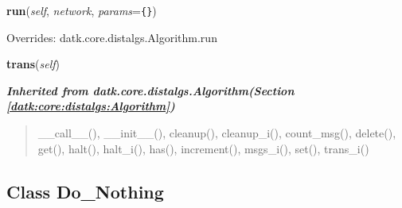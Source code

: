     \vspace{0.5ex}

\hspace{.8\funcindent}\begin{boxedminipage}{\funcwidth}

    \raggedright \textbf{run}(\textit{self}, \textit{network}, \textit{params}={\tt \texttt{\{}\texttt{\}}})

\setlength{\parskip}{2ex}
\setlength{\parskip}{1ex}
      Overrides: datk.core.distalgs.Algorithm.run

    \end{boxedminipage}

    \label{datk:core:distalgs:Synchronous_Algorithm:trans}

    \vspace{0.5ex}

\hspace{.8\funcindent}\begin{boxedminipage}{\funcwidth}

    \raggedright \textbf{trans}(\textit{self})

\setlength{\parskip}{2ex}
\setlength{\parskip}{1ex}
    \end{boxedminipage}


\large{\textbf{\textit{Inherited from datk.core.distalgs.Algorithm\textit{(Section \ref{datk:core:distalgs:Algorithm})}}}}

\begin{quote}
\_\_call\_\_(), \_\_init\_\_(), cleanup(), cleanup\_i(), count\_msg(), delete(), get(), halt(), halt\_i(), has(), increment(), msgs\_i(), set(), trans\_i()
\end{quote}


\subsection{Class Do\_Nothing}

